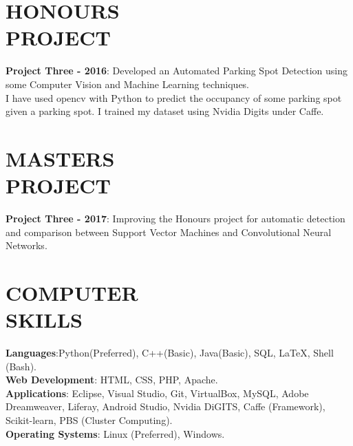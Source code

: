 \documentclass[margin]{res}
\begin{document}
\begin{resume}

\section{HONOURS\\PROJECT}
\par
\textbf{Project Three - 2016}:
Developed an Automated Parking Spot Detection using some Computer Vision and Machine Learning techniques.\\ I have used opencv with Python to predict the occupancy of some parking spot given a parking spot. I trained my dataset using Nvidia Digits under Caffe.  
\par

\section{MASTERS\\PROJECT}
\par
\textbf{Project Three - 2017}:
Improving the Honours project for automatic detection and comparison between Support Vector Machines and Convolutional Neural Networks. 
\par


\section{COMPUTER\\SKILLS}

\textbf{Languages}:Python(Preferred), C++(Basic), Java(Basic), SQL, \LaTeX, Shell (Bash).
\\
\textbf{Web Development}: HTML, CSS, PHP, Apache.
\\
\textbf{Applications}: Eclipse, Visual Studio, Git, VirtualBox, 
MySQL, Adobe Dreamweaver, Liferay, Android Studio, Nvidia DiGITS, Caffe (Framework), Scikit-learn, PBS (Cluster Computing).
\\
\textbf{Operating Systems}: 
Linux (Preferred), Windows.

\vspace{0.5mm}


\end{resume}
\end{document}
